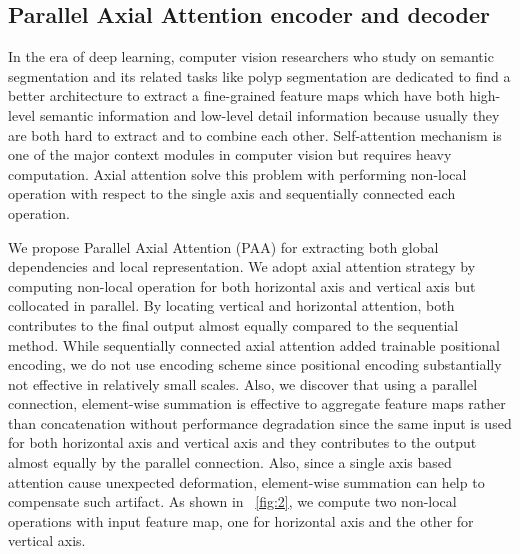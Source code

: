 \documentclass[sigconf]{acmart}
\begin{document}
\subsection{Parallel Axial Attention encoder and decoder}

In the era of deep learning, computer vision researchers who study on semantic segmentation and its related tasks like polyp segmentation are dedicated to find a better architecture to extract a fine-grained feature maps which have both high-level semantic information and low-level detail information because usually they are both hard to extract and to combine each other. Self-attention mechanism \cite{zhang2019self} is one of the major context modules in computer vision but requires heavy computation. Axial attention \cite{ho2019axial} solve this problem with performing non-local operation with respect to the single axis and sequentially connected each operation. 

We propose Parallel Axial Attention (PAA) for extracting both global dependencies and local representation. We adopt axial attention strategy by computing non-local operation for both horizontal axis and vertical axis but collocated in parallel. By locating vertical and horizontal attention, both contributes to the final output almost equally compared to the sequential method. While sequentially connected axial attention added trainable positional encoding, we do not use encoding scheme since positional encoding substantially not effective in relatively small scales. Also, we discover that using a parallel connection, element-wise summation is effective to aggregate feature maps rather than concatenation without performance degradation since the same input is used for both horizontal axis and vertical axis and they contributes to the output almost equally by the parallel connection. Also, since a single axis based attention cause unexpected deformation, element-wise summation can help to compensate such artifact. As shown in \figureautorefname~\ref{fig:2}, we compute two non-local operations with input feature map, one for horizontal axis and the other for vertical axis.
\end{document}
